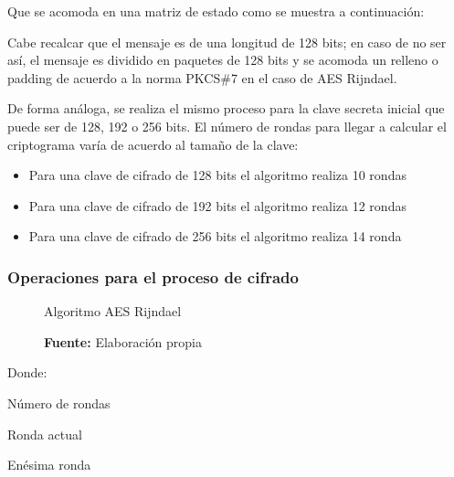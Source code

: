 \documentclass[../main/main.tex]{subfiles}
\begin{document}
  Que se acomoda en una matriz de estado como se muestra a continuación:

  \begin{table}[H]
    \centering
    
  \end{table}

  Cabe recalcar que el mensaje es de una longitud de 128 bits; en caso de no ser así, el mensaje es dividido en paquetes de 128 bits y se acomoda un relleno o padding de acuerdo a la norma PKCS\#7 en el caso de AES Rijndael.

  De forma análoga, se realiza el mismo proceso para la clave secreta inicial que puede ser de 128, 192 o 256 bits. El número de rondas para llegar a calcular el criptograma varía de acuerdo al tamaño de la clave:

  \begin{itemize}[noitemsep,nolistsep]
    \item Para una clave de cifrado de 128 bits el algoritmo realiza 10 rondas
    \item Para una clave de cifrado de 192 bits el algoritmo realiza 12 rondas
    \item Para una clave de cifrado de 256 bits el algoritmo realiza 14 ronda
  \end{itemize}

  \subsubsection{Operaciones para el proceso de cifrado}

    \begin{figure}[H]
      \centering
      \caption{Algoritmo AES Rijndael}
      
      \caption*{\textbf{Fuente:} Elaboración propia}
    \end{figure}

    Donde:

    \begin{description}
      \item[N:] Número de rondas
      \item[i:] Ronda actual
      \item[$N_a$:] Enésima ronda
    \end{description}
\end{document}
